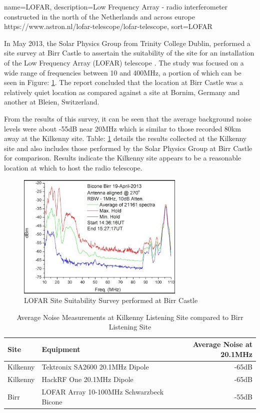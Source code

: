 \documentclass[runningheads,a4paper]{llncs}
\begin{document}
{
  name={LOFAR},
  description={Low Frequency Array - radio interferometer constructed in the north of the Netherlands and across europe https://www.astron.nl/lofar-telescope/lofar-telescope},
  sort=LOFAR
}

In May 2013, the Solar Physics Group from Trinity College Dublin, performed a site survey at Birr Castle to assertain the suitability of the site for an installation of the Low Frequency Array (\gls{LOFAR}) telescope \citep{craf-13}. The study was focused on a wide range of frequencies between 10 and 400MHz, a portion of which can be seen in Figure: \ref{fig:site_survey_lofar}. The report concluded that the location at Birr Castle was a relatively quiet location as compared against a site at Bornim, Germany and another at Bleien, Switzerland. 

From the results of this survey, it can be seen that the average background noise levels were about -55dB near 20MHz which is similar to those recorded 80km away at the Kilkenny site. Table: \ref{tab:site_survey} details the results collected at the Kilkenny site and also includes those performed by the Solar Physics Group at Birr Castle for comparison. Results indicate the Kilkenny site appears to be a reasonable location at which to host the radio telescope.

%
\begin{figure}[here]
\centering
\includegraphics[width=8cm]{images/35}
\caption{LOFAR Site Suitability Survey performed at Birr Castle \citep{craf-13}}
\label{fig:site_survey_lofar}
\end{figure}
%

%
\begin{table}
  \centering
  \begin{tabular}{p{2cm} l r}
    \toprule
    Site & Equipment & Average Noise at 20.1MHz \\ \midrule
    Kilkenny & Tektronix SA2600 20.1MHz Dipole & -65dB  \\
    Kilkenny & HackRF One 20.1MHz Dipole & -65dB \\
    Birr & LOFAR Array 10-100MHz Schwarzbeck Bicone & -55dB \\
    \bottomrule
  \end{tabular}
  \caption{Average Noise Measurements at Kilkenny Listening Site compared to Birr Listening Site \citep{craf-13}}
  \label{tab:site_survey}
\end{table}
%
\end{document}
